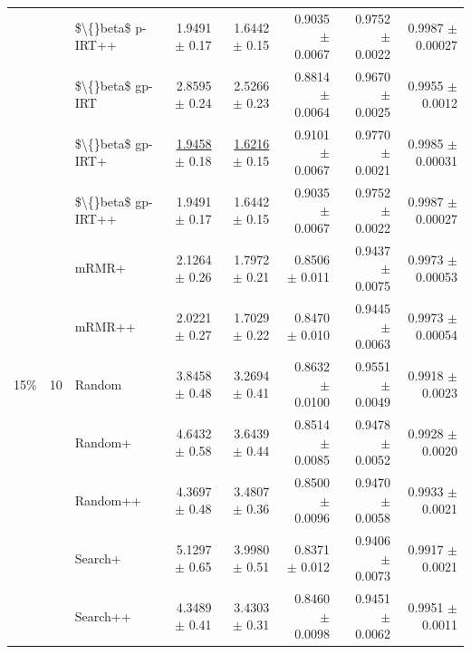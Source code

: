 \begin{longtable}{llp{}rrrrr}
 &  & \$\textbackslash\{\}beta\$ p-IRT++ & 1.9491 {\scriptsize $\pm$ 0.17} & 1.6442 {\scriptsize $\pm$ 0.15} & 0.9035 {\scriptsize $\pm$ 0.0067} & 0.9752 {\scriptsize $\pm$ 0.0022} & 0.9987 {\scriptsize $\pm$ 0.00027} \\
 &  & \$\textbackslash\{\}beta\$ gp-IRT & 2.8595 {\scriptsize $\pm$ 0.24} & 2.5266 {\scriptsize $\pm$ 0.23} & 0.8814 {\scriptsize $\pm$ 0.0064} & 0.9670 {\scriptsize $\pm$ 0.0025} & 0.9955 {\scriptsize $\pm$ 0.0012} \\
 &  & \$\textbackslash\{\}beta\$ gp-IRT+ & \underline{1.9458} {\scriptsize $\pm$ 0.18} & \underline{1.6216} {\scriptsize $\pm$ 0.15} & 0.9101 {\scriptsize $\pm$ 0.0067} & 0.9770 {\scriptsize $\pm$ 0.0021} & 0.9985 {\scriptsize $\pm$ 0.00031} \\
 &  & \$\textbackslash\{\}beta\$ gp-IRT++ & 1.9491 {\scriptsize $\pm$ 0.17} & 1.6442 {\scriptsize $\pm$ 0.15} & 0.9035 {\scriptsize $\pm$ 0.0067} & 0.9752 {\scriptsize $\pm$ 0.0022} & 0.9987 {\scriptsize $\pm$ 0.00027} \\
 &  & mRMR+ & 2.1264 {\scriptsize $\pm$ 0.26} & 1.7972 {\scriptsize $\pm$ 0.21} & 0.8506 {\scriptsize $\pm$ 0.011} & 0.9437 {\scriptsize $\pm$ 0.0075} & 0.9973 {\scriptsize $\pm$ 0.00053} \\
 &  & mRMR++ & 2.0221 {\scriptsize $\pm$ 0.27} & 1.7029 {\scriptsize $\pm$ 0.22} & 0.8470 {\scriptsize $\pm$ 0.010} & 0.9445 {\scriptsize $\pm$ 0.0063} & 0.9973 {\scriptsize $\pm$ 0.00054} \\
\midrule
15\% & 10 & Random & 3.8458 {\scriptsize $\pm$ 0.48} & 3.2694 {\scriptsize $\pm$ 0.41} & 0.8632 {\scriptsize $\pm$ 0.0100} & 0.9551 {\scriptsize $\pm$ 0.0049} & 0.9918 {\scriptsize $\pm$ 0.0023} \\
 &  & Random+ & 4.6432 {\scriptsize $\pm$ 0.58} & 3.6439 {\scriptsize $\pm$ 0.44} & 0.8514 {\scriptsize $\pm$ 0.0085} & 0.9478 {\scriptsize $\pm$ 0.0052} & 0.9928 {\scriptsize $\pm$ 0.0020} \\
 &  & Random++ & 4.3697 {\scriptsize $\pm$ 0.48} & 3.4807 {\scriptsize $\pm$ 0.36} & 0.8500 {\scriptsize $\pm$ 0.0096} & 0.9470 {\scriptsize $\pm$ 0.0058} & 0.9933 {\scriptsize $\pm$ 0.0021} \\
 &  & Search+ & 5.1297 {\scriptsize $\pm$ 0.65} & 3.9980 {\scriptsize $\pm$ 0.51} & 0.8371 {\scriptsize $\pm$ 0.012} & 0.9406 {\scriptsize $\pm$ 0.0073} & 0.9917 {\scriptsize $\pm$ 0.0021} \\
 &  & Search++ & 4.3489 {\scriptsize $\pm$ 0.41} & 3.4303 {\scriptsize $\pm$ 0.31} & 0.8460 {\scriptsize $\pm$ 0.0098} & 0.9451 {\scriptsize $\pm$ 0.0062} & 0.9951 {\scriptsize $\pm$ 0.0011} \\

\end{longtable}
